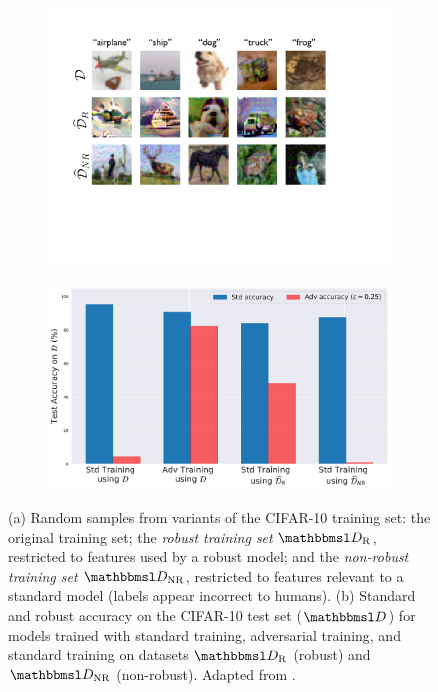\documentclass[conference,compsoc]{IEEEtran}
\begin{document}
\begin{figure}[htbp!]
	\centering
	\begin{subfigure}[b]{0.45\textwidth}
		\centering
		\includegraphics[width=1.0\textwidth]{figures/adversarial-examples/ilyas/cifar_datasets.pdf}
		\vfill\null
		\caption{}
		\label{fig:robust_inputs}
	\end{subfigure}
	\hfill
	\begin{subfigure}[b]{0.5\textwidth}
		\centering
		\includegraphics[width=\textwidth]{figures/adversarial-examples/ilyas/CIFAR_res.pdf}
		\caption{}
		\label{fig:robustify_cifar}
	\end{subfigure}
	\caption{
		(a) Random samples from variants of the
		CIFAR-10 training set:
		the original training set; 
		the \textit{robust training set} $\set D_\text{R}$, restricted to features used by a
		robust model; and
		the \textit{non-robust training set} $\set D_\text{NR}$, restricted to
		features relevant to a standard model (labels appear incorrect to humans).
		(b) Standard and robust accuracy on the CIFAR-10
		test set ($\set D$) for models trained with standard training, adversarial training, and standard training on datasets $\set D_\text{R}$ (robust) and $\set D_\text{NR}$ (non-robust). Adapted from \citet{Ilyas:2019:AENBTF}.}
	\label{fig:iliyas-experiment-results}
\end{figure}
\end{document}
